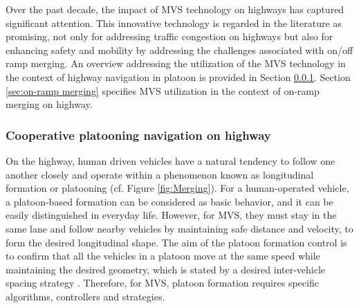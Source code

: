 

Over the past decade, the impact of MVS technology on highways has captured significant attention. This innovative technology is regarded in the literature as promising, not only for addressing traffic congestion on highways but also for enhancing safety and mobility by addressing the challenges associated with on/off ramp merging. An overview addressing the utilization of the MVS technology in the context of highway navigation in platoon is provided in Section \ref{sec:platooning_navigation}. Section \ref{sec:on-ramp merging} specifies MVS utilization in the context of on-ramp merging on highway. 

\subsubsection{Cooperative platooning navigation on highway}\label{sec:platooning_navigation}
On the highway, human driven vehicles have a natural tendency to follow one another closely and operate within a phenomenon known as longitudinal formation or platooning (cf. Figure \ref{fig:Merging}). For a human-operated vehicle, a platoon-based formation can be considered as basic behavior, and it can be easily distinguished in everyday life. However, for MVS, they must stay in the same lane and follow nearby vehicles by maintaining safe distance and velocity, to form the desired longitudinal shape. The aim of the platoon formation control is to confirm that all the vehicles in a platoon move at the same speed while maintaining the desired geometry, which is stated by a desired inter-vehicle spacing strategy \cite{hafner_survey_2022}. Therefore, for MVS, platoon formation requires specific algorithms, controllers and strategies.



